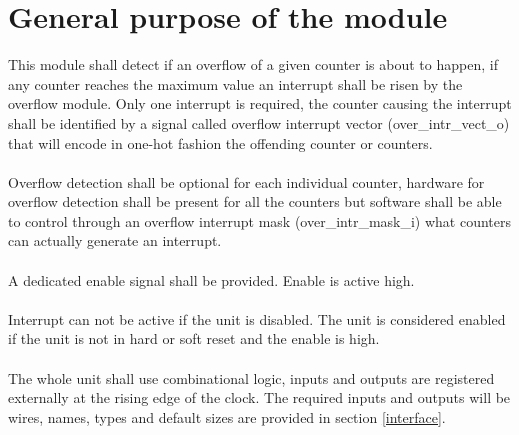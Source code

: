 \newpage
\section{General purpose of the module}

This module shall detect if an overflow of a given counter is about to happen, if any counter reaches the maximum value an interrupt shall be risen by the overflow module. Only one interrupt is required, the counter causing the interrupt shall be identified by a signal called overflow interrupt vector (over\_intr\_vect\_o) that will encode in one-hot fashion the offending counter or counters.\\
\\
Overflow detection shall be optional for each individual counter, hardware for overflow detection shall be present for all the counters but software shall be able to control through an overflow interrupt mask (over\_intr\_mask\_i) what counters can actually generate an interrupt.\\
\\
A dedicated enable signal shall be provided. Enable is active high.\\
\\
Interrupt can not be active if the unit is disabled. The unit is considered enabled if the unit is not in hard or soft reset and the enable is high.\\
\\
The whole unit shall use combinational logic, inputs and outputs are registered externally at the rising edge of the clock. The required inputs and outputs will be wires, names, types and default sizes are provided in section \ref{interface}.\\
\\
